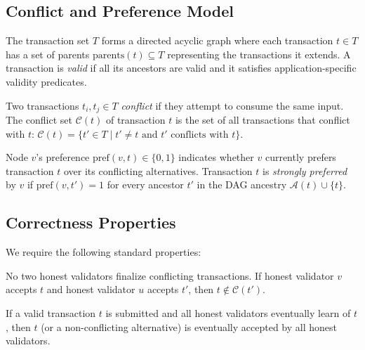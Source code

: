 \subsection{Conflict and Preference Model}

\begin{definition}
The transaction set $T$ forms a directed acyclic graph where each transaction $t \in T$
has a set of parents $\text{parents}(t) \subseteq T$ representing the transactions it
extends. A transaction is \emph{valid} if all its ancestors are valid and it satisfies
application-specific validity predicates.
\end{definition}

\begin{definition}
Two transactions $t_i, t_j \in T$ \emph{conflict} if they attempt to consume the same
input. The conflict set $\mathcal{C}(t)$ of transaction $t$ is the set of all transactions
that conflict with $t$: $\mathcal{C}(t) = \{t' \in T \mid t' \neq t \text{ and } t' \text{ conflicts with } t\}$.
\end{definition}

\begin{definition}
Node $v$'s preference $\text{pref}(v, t) \in \{0, 1\}$ indicates whether $v$ currently
prefers transaction $t$ over its conflicting alternatives. Transaction $t$ is \emph{strongly
preferred} by $v$ if $\text{pref}(v, t') = 1$ for every ancestor $t'$ in the DAG ancestry
$\mathcal{A}(t) \cup \{t\}$.
\end{definition}

\subsection{Correctness Properties}

We require the following standard properties:

\begin{definition}[Safety]
No two honest validators finalize conflicting transactions. If honest validator $v$ accepts
$t$ and honest validator $u$ accepts $t'$, then $t \notin \mathcal{C}(t')$.
\end{definition}

\begin{definition}[Liveness]
If a valid transaction $t$ is submitted and all honest validators eventually learn of $t$,
then $t$ (or a non-conflicting alternative) is eventually accepted by all honest validators.
\end{definition}

